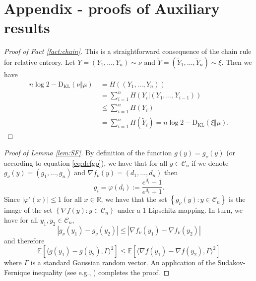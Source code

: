 \documentclass[12pt]{article}
\def \RR {\mathbb R}
\def \EE {\mathbb E}
\def \DC {\mathcal{C}_n}
\def \KL {\mathrm{D}_{\mathrm{KL}}}
\theoremstyle{definition}
\theoremstyle{remark}
\begin{document}
\section{Appendix - proofs of Auxiliary results}
\begin{proof}[Proof of Fact \ref{fact:chain}]
	This is a straightforward consequence of the chain rule for relative entrory. Let $Y=(Y_1,\dots,Y_n) \sim \nu$ and $\tilde Y= (\tilde Y_1,\dots,\tilde Y_n) \sim \xi$. Then we have
	\begin{align*}
	n \log 2 - \KL(\nu \Vert \mu) ~& = H((Y_1,\dots,Y_n)) \\
	& = \sum_{i=1}^n H(Y_i | (Y_1,...,Y_{i-1})) \\
	& \leq \sum_{i=1}^n H(Y_i) \\
	& = \sum_{i=1}^n H(\tilde Y_i) = n \log 2 - \KL(\xi \Vert \mu).
	\end{align*}
\end{proof}

\begin{proof}[Proof of Lemma \ref{lem:SF}]
	By definition of the function $g(y) = g_\nu(y)$ (or according to equation \eqref{eq:defgp}), we have that for all $y \in \DC$ if we denote $g_\nu(y)=(g_1,...,g_n)$ and $\nabla f_\nu(y) = (d_1,...,d_n)$ then
	$$
	g_i = \varphi(d_i) := \frac{e^{d_i} - 1}{e^{d_i} + 1 }.
	$$
	Since $|\varphi'(x)| \leq 1$ for all $x \in \RR$, we have that the set $\left \{ g_\nu(y) : y \in \DC  \right \}$ is the image of the set $\left \{ \nabla f(y) : y \in \DC  \right \}$ under a $1$-Lipschitz mapping. In turn, we have for all $y_1,y_2 \in \DC$,
	$$
	|g_\nu(y_1) - g_\nu(y_2)| \leq |\nabla f_\nu(y_1) - \nabla f_\nu(y_2)|
	$$
	and therefore	
	$$
	\EE \left [ \langle g(y_1) - g(y_2), \Gamma \rangle^2 \right ] \leq \EE \left [ \langle \nabla f (y_1) - \nabla f(y_2), \Gamma \rangle^2 \right ]
	$$
	where $\Gamma$ is a standard Gaussian random vector. An application of the Sudakov-Fernique inequality (see e.g., \cite[Chapter 3]{LedouxTalagBook}) completes the proof.
\end{proof}
\end{document}
